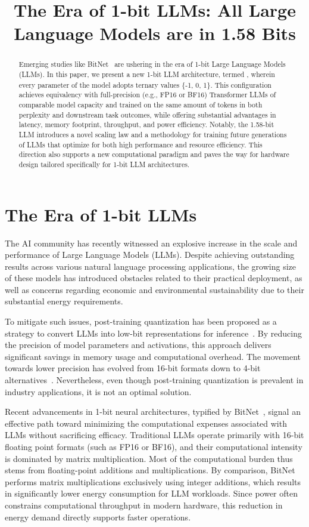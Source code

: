 \title{The Era of 1-bit LLMs: All Large Language Models are in 1.58 Bits}

\begin{abstract}
Emerging studies like BitNet~\cite{bitnet} are ushering in the era of 1-bit Large Language Models (LLMs). In this paper, we present a new 1-bit LLM architecture, termed \textbf{}, wherein every parameter of the model adopts ternary values \{-1, 0, 1\}. This configuration achieves equivalency with full-precision (e.g., FP16 or BF16) Transformer LLMs of comparable model capacity and trained on the same amount of tokens in both perplexity and downstream task outcomes, while offering substantial advantages in latency, memory footprint, throughput, and power efficiency. Notably, the 1.58-bit LLM introduces a novel scaling law and a methodology for training future generations of LLMs that optimize for both high performance and resource efficiency. This direction also supports a new computational paradigm and paves the way for hardware design tailored specifically for 1-bit LLM architectures.
\end{abstract}

\section{The Era of 1-bit LLMs}

The AI community has recently witnessed an explosive increase in the scale and performance of Large Language Models (LLMs). Despite achieving outstanding results across various natural language processing applications, the growing size of these models has introduced obstacles related to their practical deployment, as well as concerns regarding economic and environmental sustainability due to their substantial energy requirements.

To mitigate such issues, post-training quantization has been proposed as a strategy to convert LLMs into low-bit representations for inference~\cite{smoothquant, gptq, quip, quip_sharp}. By reducing the precision of model parameters and activations, this approach delivers significant savings in memory usage and computational overhead. The movement towards lower precision has evolved from 16-bit formats down to 4-bit alternatives~\cite{gptq, awq}. Nevertheless, even though post-training quantization is prevalent in industry applications, it is not an optimal solution.

Recent advancements in 1-bit neural architectures, typified by BitNet~\cite{bitnet}, signal an effective path toward minimizing the computational expenses associated with LLMs without sacrificing efficacy. Traditional LLMs operate primarily with 16-bit floating point formats (such as FP16 or BF16), and their computational intensity is dominated by matrix multiplication. Most of the computational burden thus stems from floating-point additions and multiplications. By comparison, BitNet performs matrix multiplications exclusively using integer additions, which results in significantly lower energy consumption for LLM workloads. Since power often constrains computational throughput in modern hardware, this reduction in energy demand directly supports faster operations.

